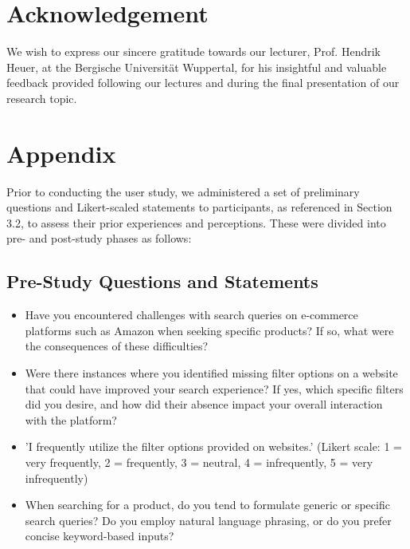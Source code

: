 \documentclass[manuscript,review]{acmart}
\begin{document}
\section{Acknowledgement}
We wish to express our sincere gratitude towards our lecturer, Prof. Hendrik Heuer, at the Bergische Universität Wuppertal, for 
his insightful and valuable feedback provided following our lectures and during the final presentation of our research topic.

\appendix
\section{Appendix}
\label{appendix:questions}
Prior to conducting the user study, we administered a set of preliminary questions and Likert-scaled 
statements to participants, as referenced in Section 3.2, to 
assess their prior experiences and perceptions. These were 
divided into pre- and post-study phases as follows:
\subsection*{Pre-Study Questions and Statements}
\begin{itemize}
  \item Have you encountered challenges with search queries on e-commerce platforms such as Amazon when seeking specific products? If so, what were the consequences of these difficulties?
  \item Were there instances where you identified missing filter options on a website that could have improved your search experience? If yes, which specific filters did you desire, and how did their absence impact your overall interaction with the platform?
  \item 'I frequently utilize the filter options provided on websites.' (Likert scale: 1 = very frequently, 2 = frequently, 3 = neutral, 4 = infrequently, 5 = very infrequently)
  \item When searching for a product, do you tend to formulate generic or specific search queries? Do you employ natural language phrasing, or do you prefer concise keyword-based inputs?
\end{itemize}
\end{document}
